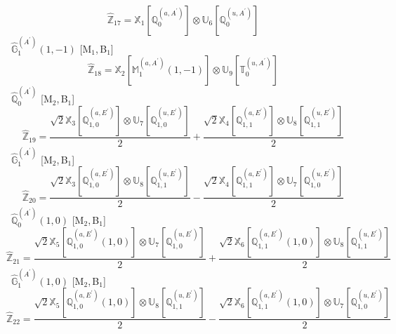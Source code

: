 \documentclass[fleqn,10pt,landscape]{article}
\begin{document}
\begin{itemize}
\begin{dmath*}
\hat{\mathbb{Z}}_{17}=\mathbb{X}_{1}[\mathbb{Q}_{0}^{(a,A^{\prime})}] \otimes\mathbb{U}_{6}[\mathbb{Q}_{0}^{(u,A^{\prime})}]
\end{dmath*}
\vspace{4mm}
\noindent {} $\,\,\,\hat{\mathbb{G}}_{1}^{(A^{\prime})}(1,-1)$ [M$_{1}$,\,B$_{1}$]
\begin{dmath*}
\hat{\mathbb{Z}}_{18}=\mathbb{X}_{2}[\mathbb{M}_{1}^{(a,A^{\prime})}(1,-1)] \otimes\mathbb{U}_{9}[\mathbb{T}_{0}^{(u,A^{\prime})}]
\end{dmath*}
\vspace{4mm}
\noindent {} $\,\,\,\hat{\mathbb{Q}}_{0}^{(A^{\prime})}$ [M$_{2}$,\,B$_{1}$]
\begin{dmath*}
\hat{\mathbb{Z}}_{19}=\frac{\sqrt{2} \mathbb{X}_{3}[\mathbb{Q}_{1,0}^{(a,E^{\prime})}] \otimes\mathbb{U}_{7}[\mathbb{Q}_{1,0}^{(u,E^{\prime})}]}{2} + \frac{\sqrt{2} \mathbb{X}_{4}[\mathbb{Q}_{1,1}^{(a,E^{\prime})}] \otimes\mathbb{U}_{8}[\mathbb{Q}_{1,1}^{(u,E^{\prime})}]}{2}
\end{dmath*}
\vspace{4mm}
\noindent {} $\,\,\,\hat{\mathbb{G}}_{1}^{(A^{\prime})}$ [M$_{2}$,\,B$_{1}$]
\begin{dmath*}
\hat{\mathbb{Z}}_{20}=\frac{\sqrt{2} \mathbb{X}_{3}[\mathbb{Q}_{1,0}^{(a,E^{\prime})}] \otimes\mathbb{U}_{8}[\mathbb{Q}_{1,1}^{(u,E^{\prime})}]}{2} - \frac{\sqrt{2} \mathbb{X}_{4}[\mathbb{Q}_{1,1}^{(a,E^{\prime})}] \otimes\mathbb{U}_{7}[\mathbb{Q}_{1,0}^{(u,E^{\prime})}]}{2}
\end{dmath*}
\vspace{4mm}
\noindent {} $\,\,\,\hat{\mathbb{Q}}_{0}^{(A^{\prime})}(1,0)$ [M$_{2}$,\,B$_{1}$]
\begin{dmath*}
\hat{\mathbb{Z}}_{21}=\frac{\sqrt{2} \mathbb{X}_{5}[\mathbb{Q}_{1,0}^{(a,E^{\prime})}(1,0)] \otimes\mathbb{U}_{7}[\mathbb{Q}_{1,0}^{(u,E^{\prime})}]}{2} + \frac{\sqrt{2} \mathbb{X}_{6}[\mathbb{Q}_{1,1}^{(a,E^{\prime})}(1,0)] \otimes\mathbb{U}_{8}[\mathbb{Q}_{1,1}^{(u,E^{\prime})}]}{2}
\end{dmath*}
\vspace{4mm}
\noindent {} $\,\,\,\hat{\mathbb{G}}_{1}^{(A^{\prime})}(1,0)$ [M$_{2}$,\,B$_{1}$]
\begin{dmath*}
\hat{\mathbb{Z}}_{22}=\frac{\sqrt{2} \mathbb{X}_{5}[\mathbb{Q}_{1,0}^{(a,E^{\prime})}(1,0)] \otimes\mathbb{U}_{8}[\mathbb{Q}_{1,1}^{(u,E^{\prime})}]}{2} - \frac{\sqrt{2} \mathbb{X}_{6}[\mathbb{Q}_{1,1}^{(a,E^{\prime})}(1,0)] \otimes\mathbb{U}_{7}[\mathbb{Q}_{1,0}^{(u,E^{\prime})}]}{2}

\end{dmath*}
\end{itemize}
\end{document}
